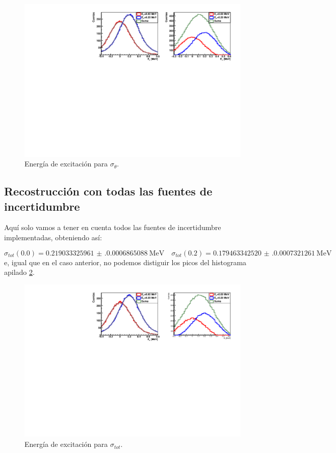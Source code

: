 \vspace*{-0.25cm}
\begin{figure}[H]
    \centering
    \includegraphics[width=1\textwidth]{Imagenes/Rec_incIdx2_single.pdf}
    \caption{Energía de excitación para $\sigma_{\theta}$.}
    \label{Fig:05-RecExcIdx2}
\end{figure}

\subsection{Recostrucción con todas las fuentes de incertidumbre}

Aquí solo vamos a tener en cuenta todos las fuentes de incertidumbre implementadas, obteniendo así: 

\begin{equation}
    \sigma_{tot}(0.0) =\num{0.219033325961(0.0006865088)} \ \text{MeV} \quad 
    \sigma_{tot}(0.2) = \num{0.179463342520(0.0007321261)} \ \text{MeV}
\end{equation} 
e, igual que en el caso anterior, no podemos distiguir los picos del histograma apilado \cref{Fig:05-RecExcIdx0}. 
\vspace*{-0.25cm}
\begin{figure}[H]
    \centering
    \includegraphics[width=1\textwidth]{Imagenes/Rec_incIdx0_single.pdf}
    \caption{Energía de excitación para $\sigma_{tot}$.}
    \label{Fig:05-RecExcIdx0}
\end{figure}

